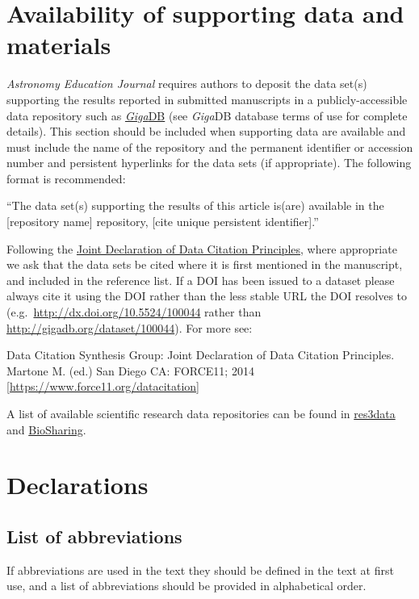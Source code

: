 \documentclass[a4paper,alpha-refs]{aejstyles}
\begin{document}
\section{Availability of supporting data and materials}

\textit{Astronomy Education Journal} requires authors to deposit the data set(s) supporting the results reported in submitted manuscripts in a publicly-accessible data repository such as \href{http://gigadb.org/}{\textit{Giga}DB} (see \textit{Giga}DB database terms of use for complete details). This section should be included when supporting data are available and must include the name of the repository and the permanent identifier or accession number and persistent hyperlinks for the data sets (if appropriate). The following format is recommended:

``The data set(s) supporting the results of this article is(are) available in the [repository name] repository, [cite unique persistent identifier].''

Following the \href{https://www.force11.org/group/joint-declaration-data-citation-principles-final}{Joint Declaration of Data Citation Principles}, where appropriate we ask that the data sets be cited where it is first mentioned in the manuscript, and included in the reference list. If a DOI has been issued to a dataset please always cite it using the DOI rather than the less stable URL the DOI resolves to (e.g.~\url{http://dx.doi.org/10.5524/100044} rather than \url{http://gigadb.org/dataset/100044}). For more see:

Data Citation Synthesis Group: Joint Declaration of Data Citation Principles. Martone M. (ed.) San Diego CA: FORCE11; 2014 [\url{https://www.force11.org/datacitation}]

A list of available scientific research data repositories can be found in \href{http://www.re3data.org/}{res3data} and \href{https://biosharing.org/}{BioSharing}.

\section{Declarations}

\subsection{List of abbreviations}
If abbreviations are used in the text they should be defined in the text at first use, and a list of abbreviations should be provided in alphabetical order.
\end{document}
